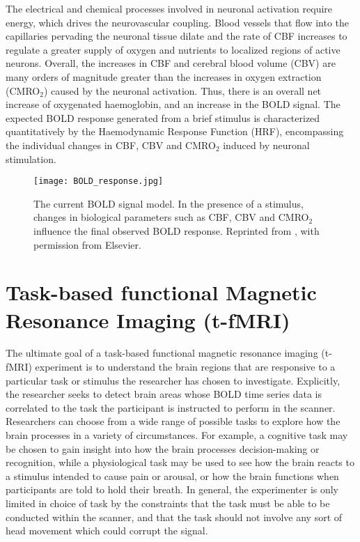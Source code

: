 The electrical and chemical processes involved in neuronal activation require energy, which drives the neurovascular coupling. Blood vessels that flow into the capillaries pervading the neuronal tissue dilate and the rate of CBF increases to regulate a greater supply of oxygen and nutrients to localized regions of active neurons. Overall, the increases in CBF and cerebral blood volume (CBV) are many orders of magnitude greater than the increases in oxygen extraction (CMRO$_{2}$) caused by the neuronal activation. Thus, there is an overall net increase of oxygenated haemoglobin, and an increase in the BOLD signal. The expected BOLD response generated from a brief stimulus is characterized quantitatively by the Haemodynamic Response Function (HRF), encompassing the individual changes in CBF, CBV and CMRO$_{2}$ induced by neuronal stimulation. 

\begin{figure}[htbp]
\centering
	\texttt{[image: BOLD\_response.jpg]}	
\caption{The current BOLD signal model. In the presence of a stimulus, changes in biological parameters such as CBF, CBV and CMRO$_{2}$ influence the final observed BOLD response. Reprinted from \citet*{Buxton2012-ly}, with permission from Elsevier.}
\end{figure}


\section{Task-based functional Magnetic Resonance Imaging (t-fMRI)} 
\label{sec:t-fMRI}

The ultimate goal of a task-based functional magnetic resonance imaging (t-fMRI) experiment is to understand the brain regions that are responsive to a particular task or stimulus the researcher has chosen to investigate. Explicitly, the researcher seeks to detect brain areas whose BOLD time series data is correlated to the task the participant is instructed to perform in the scanner. Researchers can choose from a wide range of possible tasks to explore how the brain processes in a variety of circumstances. For example, a cognitive task may be chosen to gain insight into how the brain processes decision-making or recognition, while a physiological task may be used to see how the brain reacts to a stimulus intended to cause pain or arousal, or how the brain functions when participants are told to hold their breath. In general, the experimenter is only limited in choice of task by the constraints that the task must be able to be conducted within the scanner, and that the task should not involve any sort of head movement which could corrupt the signal. 

